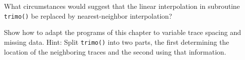 %
%
%
%
%
%
%
%

\begin{exer}
\item
	What circumstances would suggest that the
	linear interpolation in subroutine \texttt{trimo()} 
	be replaced by nearest-neighbor interpolation?
\item
	Show how to adapt the programs of this chapter
	to variable trace spacing and missing data.
	Hint: Split {\tt trimo()} into two parts,
	the first determining the location of the neighboring
	traces and the second using that information.
\end{exer}

